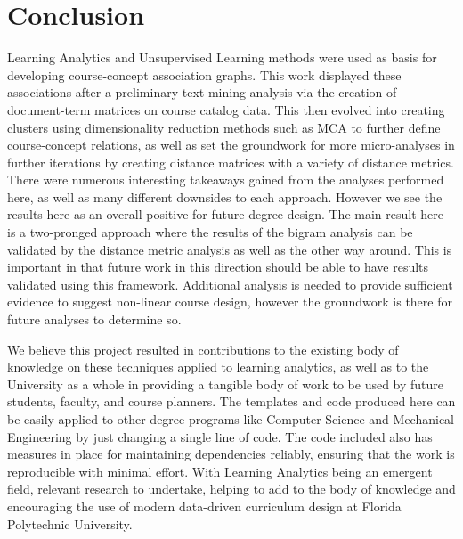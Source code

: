 %
%
%

\chapter{Conclusion}

Learning Analytics and Unsupervised Learning methods were used as basis for developing course-concept association graphs. 
This work displayed these associations after a preliminary text mining analysis via the creation of document-term matrices 
on course catalog data.  This then evolved into creating clusters using dimensionality reduction methods such as MCA to 
further define course-concept relations, as well as set the groundwork for more  micro-analyses in further iterations by 
creating distance matrices with a variety of distance metrics.  There were numerous interesting takeaways gained from the 
analyses performed here, as well as many different downsides to each approach. However we see the results here as an 
overall positive for future degree design. The main result here is a two-pronged approach where the results of the bigram analysis
can be validated by the distance metric analysis as well as the other way around. This is important in that future work in this direction
should be able to have results validated using this framework. Additional analysis is needed to provide sufficient evidence to suggest 
non-linear course design,  however the groundwork is there for future analyses to determine so.

We believe this  project resulted in contributions to the existing body of knowledge on these techniques applied to 
learning analytics, as well as to the University as a whole in providing a tangible body of work to be used by future 
students, faculty, and course planners.   The templates and code produced here can be easily applied to other 
degree programs like Computer Science and Mechanical Engineering by just changing a single line of code. The code 
included also has measures in place for maintaining dependencies reliably,  ensuring that the work is reproducible 
with minimal effort. With Learning Analytics being an emergent field, relevant research to undertake, helping to add 
to the body of knowledge and encouraging the use of modern data-driven curriculum design at Florida Polytechnic University. 

\nocite{*}






